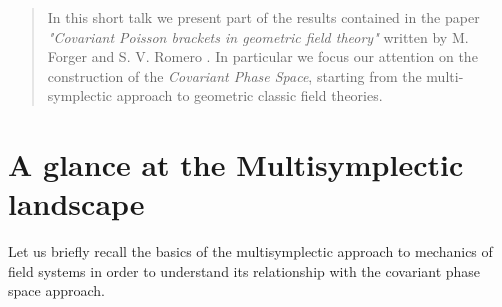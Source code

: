 \documentclass[a4paper,12pt,fleqn]{scrartcl}  %
\begin{document}
\maketitle

\begin{abstract}
In this short talk we present part of the results contained in the paper \emph{"Covariant Poisson brackets in geometric field theory"} written by M. Forger and S. V. Romero \cite{forgeromero}.
In particular we focus our attention on the construction of the \emph{Covariant Phase Space}, starting from the multi-symplectic approach to geometric classic field theories.

\end{abstract}

\section{A glance at the Multisymplectic landscape}
Let us briefly recall the basics of the multisymplectic approach to mechanics of field systems in order to understand its relationship with the covariant phase space approach.

\begin{center}
  
\end{center}
\end{document}
